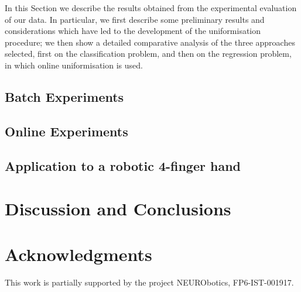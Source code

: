 \documentclass[twocolumn,referee]{svjour2}
\begin{document}
In this Section we describe the results obtained from the experimental
evaluation of our data. In particular, we first describe some
preliminary results and considerations which have led to the
development of the uniformisation procedure; we then show a detailed
comparative analysis of the three approaches selected, first on the
classification problem, and then on the regression problem, in which
online uniformisation is used.

\subsection{Batch Experiments}
\label{subsec:strategy}


\subsection{Online Experiments}
\label{subsec:online}


\subsection{Application to a robotic 4-finger hand}
\label{subsec:application}


\section{Discussion and Conclusions}
\label{sec:discussion}


\section*{Acknowledgments}

This work is partially supported by the project NEURObotics,
FP6-IST-001917.

{\small

%

}


\end{document}
